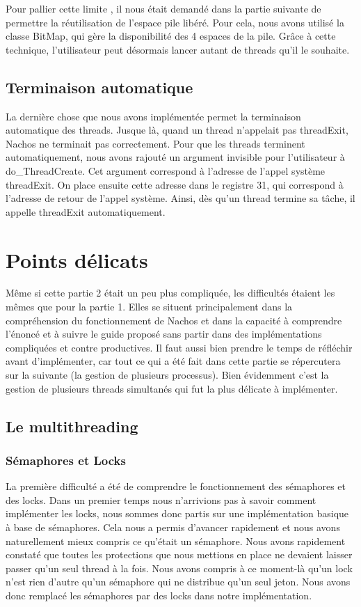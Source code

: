 \documentclass[10pt]{article}
\begin{document}
Pour pallier cette limite , il nous était demandé dans la partie suivante de permettre la réutilisation de l'espace pile libéré.
Pour cela, nous avons utilisé la classe BitMap, qui gère la disponibilité des 4 espaces de la pile.
Grâce à cette technique, l'utilisateur peut désormais lancer autant
de threads qu'il le souhaite.

\subsection{Terminaison automatique}
La dernière chose que nous avons implémentée permet la terminaison automatique des threads. Jusque là, quand un thread n'appelait pas threadExit, Nachos ne terminait pas correctement.
Pour que les threads terminent automatiquement, nous avons rajouté un argument invisible pour l'utilisateur à do\_ThreadCreate. Cet argument correspond à l'adresse de l'appel système threadExit.
On place ensuite cette adresse dans le registre 31, qui correspond à l'adresse de retour de l'appel système. Ainsi, dès qu'un thread termine sa tâche, il appelle threadExit automatiquement.


\section {Points délicats}

Même si cette partie 2 était un peu plus compliquée, les difficultés étaient les mêmes
que pour la partie 1. Elles se situent principalement dans la compréhension du fonctionnement
de Nachos et dans la capacité à comprendre l'énoncé et à suivre le guide proposé sans
partir dans des implémentations compliquées et contre productives. Il faut aussi
bien prendre le temps de réfléchir avant d'implémenter, car tout ce qui a été fait dans
cette partie se répercutera sur la suivante (la gestion de plusieurs processus).
\newline
Bien évidemment c'est la gestion de plusieurs threads simultanés qui fut la plus délicate
à implémenter.

\subsection{Le multithreading}
\subsubsection{Sémaphores et Locks}
La première difficulté a été de comprendre le fonctionnement des sémaphores et des locks.
Dans un premier temps nous n'arrivions pas à savoir comment implémenter les locks, nous sommes
donc partis sur une implémentation basique à base de sémaphores. Cela nous a permis d'avancer
rapidement et nous avons naturellement mieux compris ce qu'était un sémaphore.
Nous avons rapidement constaté que toutes les protections que nous mettions en place ne
devaient laisser passer qu'un seul thread à la fois. Nous avons compris à ce moment-là qu'un
lock n'est rien d'autre qu'un sémaphore qui ne distribue qu'un seul jeton.
Nous avons donc remplacé les sémaphores par des locks dans notre implémentation.
\end{document}
